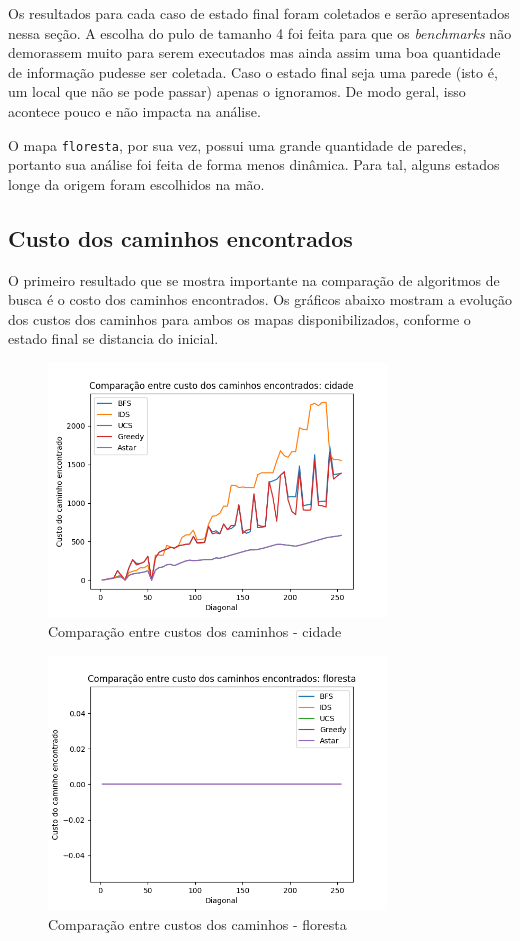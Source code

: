 \documentclass{article}
\begin{document}
Os resultados para cada caso de estado final foram coletados e serão apresentados nessa seção. A escolha do pulo de tamanho 4 foi feita para que os \textit{benchmarks} não demorassem muito para serem executados mas ainda assim
uma boa quantidade de informação pudesse ser coletada. Caso o estado final seja uma parede (isto é, um local que não se pode passar) apenas o ignoramos. De modo geral, isso acontece pouco e não impacta na análise.

O mapa \texttt{floresta}, por sua vez, possui uma grande quantidade de paredes, portanto sua análise foi feita de forma menos dinâmica. Para tal, alguns estados longe da origem foram escolhidos na mão.

\subsection{Custo dos caminhos encontrados}

O primeiro resultado que se mostra importante na comparação de algoritmos de busca é o costo dos caminhos encontrados. Os gráficos abaixo mostram a evolução dos custos dos caminhos para ambos os mapas disponibilizados,
conforme o estado final se distancia do inicial.

\begin{figure}[H]
	\centering
	\includegraphics[width=0.8\textwidth]{../images/cidade_cost_benchmark.png}
	\caption{Comparação entre custos dos caminhos - cidade}
\end{figure}

\begin{figure}[H]
	\centering
	\includegraphics[width=0.8\textwidth]{../images/floresta_cost_benchmark.png}
	\caption{Comparação entre custos dos caminhos - floresta}
\end{figure}
\end{document}
